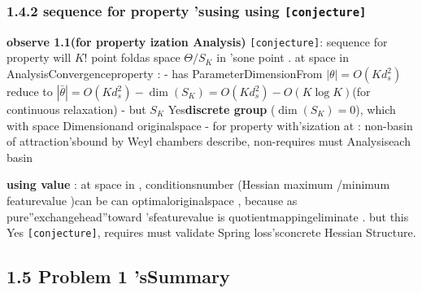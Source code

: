 \documentclass[
  12pt,
]{article}
\begin{document}
\subsubsection{\texorpdfstring{1.4.2 sequence for property 'susing using 
\texttt{{[}conjecture{]}}}{1.4.2 sequence for property 'susing using  {[}conjecture{]}}}\label{ux6392ux5217ux5bf9ux79f0ux6027ux7684ux6b63ux9762ux5229ux7528-ux731cux60f3}

\textbf{observe 1.1(for property ization Analysis)} \texttt{{[}conjecture{]}}: sequence for property will 
\(K!\) point foldas space  \(\Theta/S_K\)
in 'sone point . at space in AnalysisConvergenceproperty :  - has ParameterDimensionFrom
\(|\theta| = O(K d_s^2)\) reduce to 
\(|\bar{\theta}| = O(K d_s^2) - \dim(S_K) = O(K d_s^2) - O(K \log K)\)(for continuous relaxation)
- but  \(S_K\)
Yes\textbf{discrete group }(\(\dim(S_K) = 0\)), which with space Dimensionand originalspace  -
for property with'sization at : non-basin of attraction'sbound by  Weyl chambers
describe, non-requires must Analysiseach basin

\textbf{using value }: at space in , conditionsnumber (Hessian
maximum /minimum featurevalue )can be can optimaloriginalspace , because as pure''exchangehead''toward 'sfeaturevalue is quotientmappingeliminate . but this Yes
\texttt{{[}conjecture{]}}, requires must validate  Spring loss'sconcrete  Hessian Structure. 

\subsection{1.5 Problem 1 'sSummary}\label{ux95eeux9898-1-ux7684ux603bux7ed3}
\end{document}
